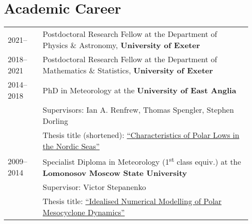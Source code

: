 \documentclass[a4paper, 11pt]{article}
\begin{document}
\section{Academic Career}
\begin{tabularx}{\linewidth}{@{}l X@{}}
2021--     & Postdoctoral Research Fellow at the Department of Physics \& Astronomy, \textbf{University of Exeter} \\
2018--2021 & Postdoctoral Research Fellow at the Department of Mathematics \& Statistics, \textbf{University of Exeter} \\
2014--2018 & PhD in Meteorology at the \textbf{University of East Anglia} \\
& Supervisors: Ian A. Renfrew, Thomas Spengler, Stephen Dorling \\
& Thesis title (shortened): \href{https://ueaeprints.uea.ac.uk/id/eprint/68204/}{``Characteristics of Polar Lows in the Nordic Seas''} \\ %
2009--2014 & Specialist Diploma in Meteorology (1\textsuperscript{st} class equiv.) at the \textbf{Lomonosov Moscow State University}  \\
& Supervisor: Victor Stepanenko \\
& Thesis title: \href{https://figshare.com/articles/thesis/SergeevDE_diploma_pdf/5326846/1}{``Idealised Numerical Modelling of Polar Mesocyclone Dynamics''}\\
\end{tabularx}

\end{document}
